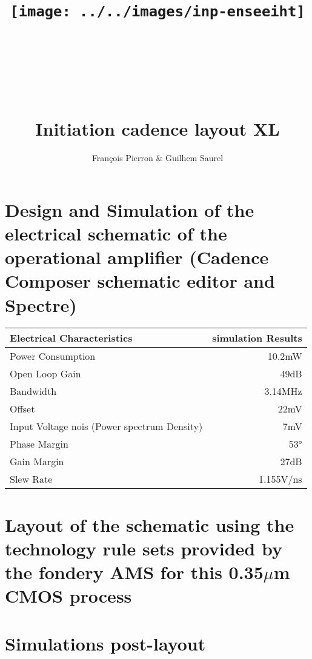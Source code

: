 \documentclass{article}
\title{\texttt{[image: ../../images/inp-enseeiht]} \\ ~ \\ ~ \\ ~ \\ ~ \\ Initiation cadence layout XL}
\author{François Pierron \& Guilhem Saurel}
\date{\oldstylenums{\today}}
\begin{document}
\begin{titlepage}
    \setcounter{page}{0}
    \maketitle
    \vfill
    \tableofcontents
    \thispagestyle{empty}
\end{titlepage}

\section{Design and Simulation of the electrical schematic of the operational amplifier (Cadence Composer schematic editor and Spectre)}

\begin{tabular}{|l|r|}
    \hline
    Electrical Characteristics & simulation Results \\
    \hline
    Power Consumption & 10.2mW\\
    \hline
    Open Loop Gain & 49dB\\
    \hline
    Bandwidth & 3.14MHz\\
    \hline
    Offset & 22mV\\
    \hline
    Input Voltage nois (Power spectrum Density) & 7mV \\
    \hline
    Phase Margin & 53°\\
    \hline
    Gain Margin & 27dB\\
    \hline
    Slew Rate & 1.155V/ns\\
    \hline
\end{tabular}


\section{Layout of the schematic using the technology rule sets provided by the fondery AMS for this 0.35$\mu$m CMOS process}


\section{Simulations post-layout}
\end{document}
